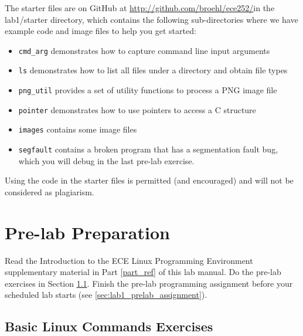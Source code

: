 The starter files are on GitHub at \url{http://github.com/broehl/ece252/}in the lab1/starter directory, which contains the following sub-directories where we have example code and image files to help you get started:
\begin{itemize}
    \item \verb+cmd_arg+ demonstrates how to capture command line input arguments
    \item \verb+ls+ demonstrates how to list all files under a directory and obtain file types
    \item \verb+png_util+ provides a set of utility functions to process a PNG image file
    \item \verb+pointer+ demonstrates how to use pointers to access a C structure
    \item \verb+images+ contains some image files
    \item \verb+segfault+ contains a broken program that has a segmentation fault bug, which you will debug in the last pre-lab exercise.
\end{itemize}
Using the code in the starter files is permitted (and encouraged) and will not be considered as plagiarism.

\section{Pre-lab Preparation}

Read the Introduction to the ECE Linux Programming Environment supplementary material in Part \ref{part_ref} of this lab manual. Do the pre-lab exercises in Section \ref{sec_ex1}. Finish the pre-lab programming assignment before your scheduled lab starts (see \ref{sec:lab1_prelab_assignment}).
\subsection{Basic Linux Commands Exercises}
\label{sec_ex1}

